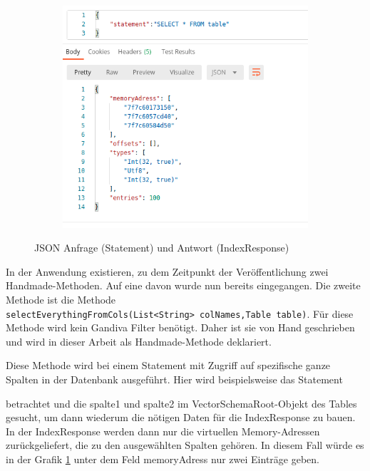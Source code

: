 \begin{figure}[h]
  \centering
  \begin{subfigure}[b]{0.5\textwidth}
    \includegraphics[width=1.0\linewidth]{img/json}
  \end{subfigure}
  \caption{JSON Anfrage (Statement) und Antwort (IndexResponse)}
  \label{graf_4}
\end{figure}

In der Anwendung existieren, zu dem Zeitpunkt der Veröffentlichung zwei Handmade-Methoden. Auf eine davon wurde nun bereits eingegangen. Die zweite Methode ist die Methode\\ \texttt{selectEverythingFromCols(List<String> colNames,Table table)}. Für diese Methode wird kein Gandiva Filter benötigt. Daher ist sie von Hand geschrieben und wird in dieser Arbeit als Handmade-Methode deklariert.

Diese Methode wird bei einem Statement mit Zugriff auf spezifische ganze Spalten in der Datenbank ausgeführt. Hier wird beispielsweise das Statement   

\begin{center}
\end{center}

betrachtet und die \glq{}spalte1\grq{} und \glq{}spalte2\grq{} im VectorSchemaRoot-Objekt des Tables gesucht, um dann wiederum die nötigen Daten für die IndexResponse zu bauen.
In der IndexResponse werden dann nur die virtuellen Memory-Adressen zurückgeliefert, die zu den ausgewählten Spalten gehören.
In diesem Fall würde es in der Grafik \ref{graf_4} unter dem Feld memoryAdress nur zwei Einträge geben.

